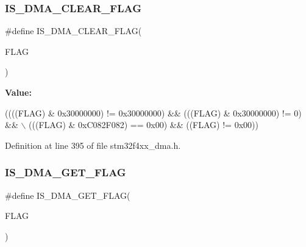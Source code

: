\subsubsection{\texorpdfstring{I\+S\+\_\+\+D\+M\+A\+\_\+\+C\+L\+E\+A\+R\+\_\+\+F\+L\+AG}{IS\_DMA\_CLEAR\_FLAG}}
{\footnotesize\ttfamily \#define I\+S\+\_\+\+D\+M\+A\+\_\+\+C\+L\+E\+A\+R\+\_\+\+F\+L\+AG(\begin{DoxyParamCaption}\item[{}]{F\+L\+AG }\end{DoxyParamCaption})}

{\bfseries Value\+:}
\begin{DoxyCode}
((((FLAG) & 0x30000000) != 0x30000000) && (((FLAG) & 0x30000000) != 0) && \(\backslash\)
                                 (((FLAG) & 0xC082F082) == 0x00) && ((FLAG) != 0x00))
\end{DoxyCode}


Definition at line 395 of file stm32f4xx\+\_\+dma.\+h.

\mbox{\label{group___d_m_a__flags__definition_ga98e421aa0a15fbeecb4cab3612985676}} 
\subsubsection{\texorpdfstring{I\+S\+\_\+\+D\+M\+A\+\_\+\+G\+E\+T\+\_\+\+F\+L\+AG}{IS\_DMA\_GET\_FLAG}}
{\footnotesize\ttfamily \#define I\+S\+\_\+\+D\+M\+A\+\_\+\+G\+E\+T\+\_\+\+F\+L\+AG(\begin{DoxyParamCaption}\item[{}]{F\+L\+AG }\end{DoxyParamCaption})}

